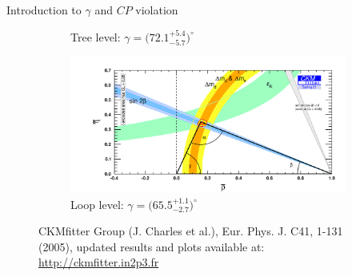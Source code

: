 \documentclass[xcolor={dvipsnames}]{beamer}
\begin{document}
\begin{frame}{Introduction to $\gamma$ and $C\!P$ violation}
\begin{figure}
\begin{subfigure}{0.5\textwidth}
      \caption{Tree level: $\gamma = \big(72.1^{+5.4}_{-5.7}\big)^\circ$}
    \end{subfigure}%
    \begin{subfigure}{0.5\textwidth}
      \centering
      \includegraphics[width = 1.0\textwidth]{Plots/ckmfitter_loop.png}
      \caption{Loop level: $\gamma = \big(65.5^{+1.1}_{-2.7}\big)^\circ$}
    \end{subfigure}
    \vspace{-0.8cm}
    \captionsetup{justification=centering}
    \caption*{\centering\tiny CKMfitter Group (J. Charles et al.), Eur. Phys. J. C41, 1-131 (2005), updated results and plots available at: \href{http://ckmfitter.in2p3.fr}{http://ckmfitter.in2p3.fr}}
  \end{figure}
\end{frame}
\end{document}
